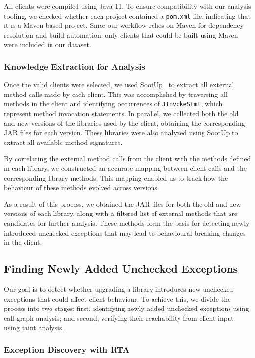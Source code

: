 All clients were compiled using Java 11. To ensure compatibility with our analysis tooling, we checked whether each project contained a \texttt{pom.xml} file, indicating that it is a Maven-based project. Since our workflow relies on Maven for dependency resolution and build automation, only clients that could be built using Maven were included in our dataset.

\subsubsection{Knowledge Extraction for Analysis}

Once the valid clients were selected, we used SootUp~\cite{Karakaya24:_sootup} to extract all external method calls made by each client. This was accomplished by traversing all methods in the client and identifying occurrences of \texttt{JInvokeStmt}, which represent method invocation statements. In parallel, we collected both the old and new versions of the libraries used by the client, obtaining the corresponding JAR files for each version. These libraries were also analyzed using SootUp to extract all available method signatures.

By correlating the external method calls from the client with the methods defined in each library, we constructed an accurate mapping between client calls and the corresponding library methods. This mapping enabled us to track how the behaviour of these methods evolved across versions.

As a result of this process, we obtained the JAR files for both the old and new versions of each library, along with a filtered list of external methods that are candidates for further analysis. These methods form the basis for detecting newly introduced unchecked exceptions that may lead to behavioural breaking changes in the client.

\subsection{Finding Newly Added Unchecked Exceptions}

Our goal is to detect whether upgrading a library introduces new unchecked exceptions that could affect client behaviour. To achieve this, we divide the process into two stages: first, identifying newly added unchecked exceptions using call graph analysis; and second, verifying their reachability from client input using taint analysis.

\subsubsection{Exception Discovery with RTA}

